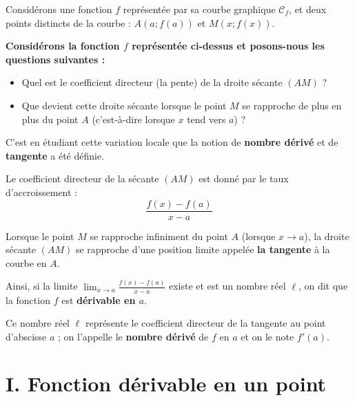 \documentclass[12pt,a4paper]{article}
\begin{document}
\begin{activiteintro}

Considérons une fonction $f$ représentée par sa courbe graphique $\mathcal{C}_f$, et deux points distincts de la courbe : $A(a ; f(a))$ et $M(x ; f(x))$.

\vspace{0.3cm}

\textbf{Considérons la fonction $f$ représentée ci-dessus et posons-nous les questions suivantes :}

\begin{itemize}
    \item Quel est le coefficient directeur (la pente) de la droite sécante $(AM)$ ?
    \item Que devient cette droite sécante lorsque le point $M$ se rapproche de plus en plus du point $A$ (c'est-à-dire lorsque $x$ tend vers $a$) ?
\end{itemize}

\vspace{0.2cm}

C'est en étudiant cette variation locale que la notion de \textbf{nombre dérivé} et de \textbf{tangente} a été définie.

\vspace{0.2cm}

Le coefficient directeur de la sécante $(AM)$ est donné par le taux d'accroissement :
\[
\frac{f(x) - f(a)}{x - a}
\]

Lorsque le point $M$ se rapproche infiniment du point $A$ (lorsque $x \to a$), la droite sécante $(AM)$ se rapproche d'une position limite appelée \textbf{la tangente} à la courbe en $A$.

\vspace{0.2cm}

Ainsi, si la limite $\displaystyle \lim_{x \to a} \frac{f(x) - f(a)}{x - a}$ existe et est un nombre réel $\ell$, on dit que la fonction $f$ est \textbf{dérivable en $a$}.

\vspace{0.2cm}

Ce nombre réel $\ell$ représente le coefficient directeur de la tangente au point d'abscisse $a$ ; on l'appelle le \textbf{nombre dérivé} de $f$ en $a$ et on le note $f'(a)$.

\end{activiteintro}

\section*{I. Fonction dérivable en un point}
\end{document}
